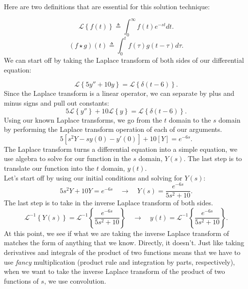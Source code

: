 \documentclass[a4paper,12pt]{article}
\begin{document}
 Here are two definitions that are essential for this solution technique:
 
\begin{equation}
  \mathcal{L}\left\{f(t)\right\} \triangleq \int_{0}^{\infty}f(t)e^{-st}dt.
\end{equation}
\begin{equation}
	(f\star g)(t) \triangleq \int_{0}^{t}f(\tau)g(t-\tau)d\tau. \label{convolution}
\end{equation}
We can start off by taking the Laplace transform of both sides of our differential equation:

$$ \mathcal{L}\left\{5y'' + 10y\right\} = \mathcal{L}\left\{\delta(t-6)\right\}. $$
Since the Laplace transform is a linear operator, we can separate by plus and minus signs and pull out constants:
$$ 5\mathcal{L}\left\{y''\right\} + 10\mathcal{L}\left\{y\right\} = \mathcal{L}\left\{\delta(t-6)\right\}. $$
Using our known Laplace transforms, we go from the $t$ domain to the $s$ domain by performing the Laplace transform operation of each of our arguments.
$$ 5[s^2Y - sy(0) - y'(0)] + 10[Y] = e^{-6s}. $$
The Laplace transform turns a differential equation into a simple equation, we use algebra to solve for our function in the $s$ domain, $Y(s)$. The last step is to translate our function into the $t$ domain, $y(t)$.\\

Let's start off by using our initial conditions and solving for $Y(s)$:
$$ 5s^2Y + 10Y = e^{-6s} \quad\rightarrow\quad Y(s) = \frac{e^{-6s}}{5s^2 + 10}. $$
The last step is to take in the inverse Laplace transform of both sides.
$$ \mathcal{L}^{-1}\left\{Y(s)\right\} = \mathcal{L}^{-1}\left\{\frac{e^{-6s}}{5s^2 + 10}\right\} \quad\rightarrow\quad y(t) = \mathcal{L}^{-1}\left\{\frac{e^{-6s}}{5s^2 + 10}\right\}. $$
At this point, we see if what we are taking the inverse Laplace transform of matches the form of anything that we know. Directly, it doesn't. Just like taking derivatives and integrals of the product of two functions means that we have to use \textit{fancy} multiplication (product rule and integration by parts, respectively), when we want to take the inverse Laplace transform of the product of two functions of $s$, we use convolution.\\
\end{document}
